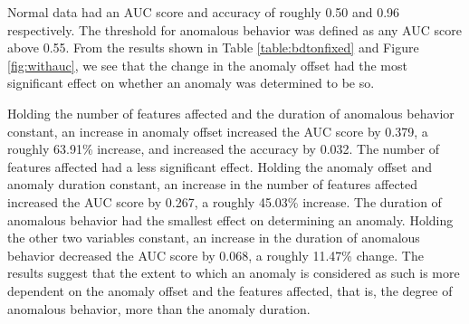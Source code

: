\documentclass[5p]{elsarticle}
\begin{document}
Normal data had an AUC score and accuracy of roughly 0.50 and 0.96 respectively. 
The threshold for anomalous behavior was defined as any AUC score above 0.55. 
From the results shown in Table \ref{table:bdtonfixed} and Figure \ref{fig:withauc}, we see that the change in the anomaly offset had the most significant effect on whether an anomaly was determined to be so.

Holding the number of features affected and the duration of anomalous behavior constant, an increase in anomaly offset increased the AUC score by 0.379, a roughly 63.91\% increase, and increased the accuracy by 0.032. The number of features affected had a less significant effect. Holding the anomaly offset and anomaly duration constant, an increase in the number of features affected increased the AUC score by 0.267, a roughly 45.03\% increase. The duration of anomalous behavior had the smallest effect on determining an anomaly. Holding the other two variables constant, an increase in the duration of anomalous behavior decreased the AUC score by 0.068, a roughly 11.47\% change. The results suggest that the extent to which an anomaly is considered as such is more dependent on the anomaly offset and the features affected, that is, the degree of anomalous behavior, more than the anomaly duration.
\end{document}
